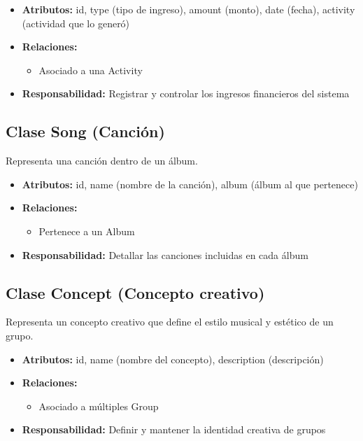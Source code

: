\documentclass[12pt,a4paper,spanish,oneside]{report}
\begin{document}
\begin{itemize}
	\item \textbf{Atributos:} id, type (tipo de ingreso), amount (monto), date (fecha), activity (actividad que lo generó)
	\item \textbf{Relaciones:}
	\begin{itemize}
		\item Asociado a una Activity
	\end{itemize}
	\item \textbf{Responsabilidad:} Registrar y controlar los ingresos financieros del sistema
\end{itemize}

\subsection{Clase Song (Canción)}
Representa una canción dentro de un álbum.

\begin{itemize}
	\item \textbf{Atributos:} id, name (nombre de la canción), album (álbum al que pertenece)
	\item \textbf{Relaciones:}
	\begin{itemize}
		\item Pertenece a un Album
	\end{itemize}
	\item \textbf{Responsabilidad:} Detallar las canciones incluidas en cada álbum
\end{itemize}

\subsection{Clase Concept (Concepto creativo)}
Representa un concepto creativo que define el estilo musical y estético de un grupo.

\begin{itemize}
	\item \textbf{Atributos:} id, name (nombre del concepto), description (descripción)
	\item \textbf{Relaciones:}
	\begin{itemize}
		\item Asociado a múltiples Group
	\end{itemize}
	\item \textbf{Responsabilidad:} Definir y mantener la identidad creativa de grupos
\end{itemize}
\end{document}
